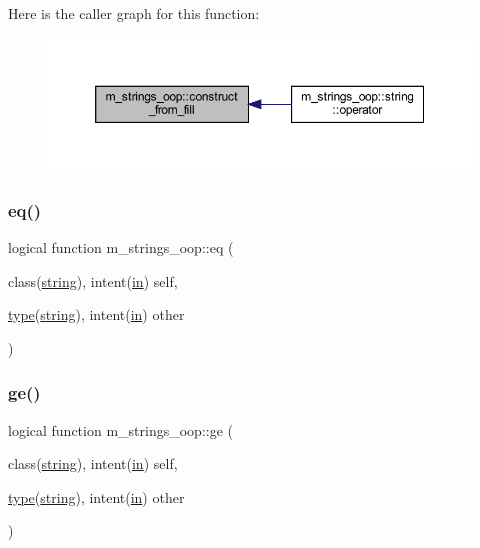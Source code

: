 Here is the caller graph for this function\+:
\nopagebreak
\begin{figure}[H]
\begin{center}
\leavevmode
\includegraphics[width=350pt]{namespacem__strings__oop_a411874cce2f16fee4d05d7528b510703_icgraph}
\end{center}
\end{figure}
\mbox{\label{namespacem__strings__oop_a2e5c8d9117609e553db07a1eba18b1fa}} 
\subsubsection{\texorpdfstring{eq()}{eq()}}
{\footnotesize\ttfamily logical function m\+\_\+strings\+\_\+oop\+::eq (\begin{DoxyParamCaption}\item[{class(\hyperlink{structm__strings__oop_1_1string}{string}), intent(\hyperlink{M__journal_83_8txt_afce72651d1eed785a2132bee863b2f38}{in})}]{self,  }\item[{\hyperlink{stop__watch_83_8txt_a70f0ead91c32e25323c03265aa302c1c}{type}(\hyperlink{structm__strings__oop_1_1string}{string}), intent(\hyperlink{M__journal_83_8txt_afce72651d1eed785a2132bee863b2f38}{in})}]{other }\end{DoxyParamCaption})\hspace{0.3cm}{\ttfamily [private]}}

\mbox{\label{namespacem__strings__oop_a2d31ec44898046ba97aebc0de32de19a}} 
\subsubsection{\texorpdfstring{ge()}{ge()}}
{\footnotesize\ttfamily logical function m\+\_\+strings\+\_\+oop\+::ge (\begin{DoxyParamCaption}\item[{class(\hyperlink{structm__strings__oop_1_1string}{string}), intent(\hyperlink{M__journal_83_8txt_afce72651d1eed785a2132bee863b2f38}{in})}]{self,  }\item[{\hyperlink{stop__watch_83_8txt_a70f0ead91c32e25323c03265aa302c1c}{type}(\hyperlink{structm__strings__oop_1_1string}{string}), intent(\hyperlink{M__journal_83_8txt_afce72651d1eed785a2132bee863b2f38}{in})}]{other }\end{DoxyParamCaption})\hspace{0.3cm}{\ttfamily [private]}}

